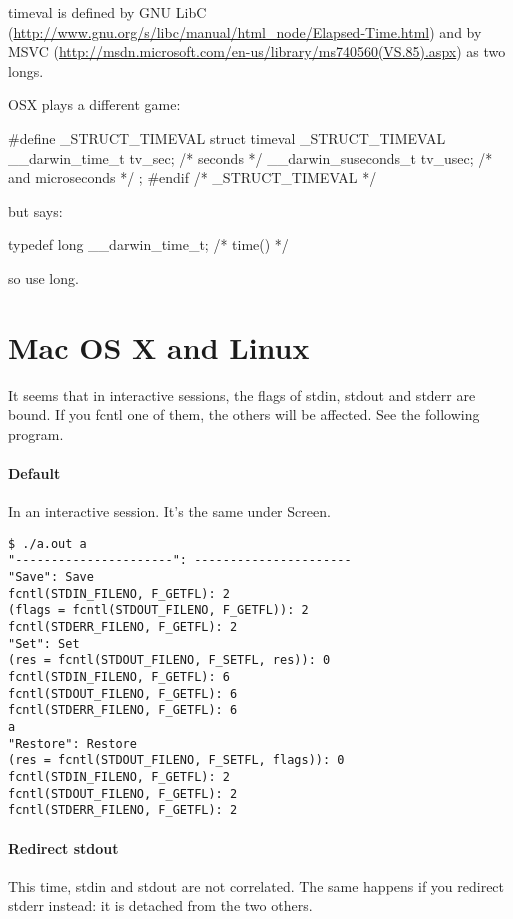 \documentclass[openright,twoside,11pt]{book}
\begin{document}
timeval is defined by GNU LibC
(\url{http://www.gnu.org/s/libc/manual/html_node/Elapsed-Time.html}) and by
MSVC (\url{http://msdn.microsoft.com/en-us/library/ms740560(VS.85).aspx}) as
two longs.

OSX plays a different game:

\begin{cxx}
#define _STRUCT_TIMEVAL         struct timeval
_STRUCT_TIMEVAL
{
        __darwin_time_t         tv_sec;         /* seconds */
        __darwin_suseconds_t    tv_usec;        /* and microseconds */
};
#endif /* _STRUCT_TIMEVAL */
\end{cxx}

\noindent
but  says:

\begin{cxx}
typedef long                 __darwin_time_t;        /* time() */
\end{cxx}

\noindent

so use long.

\section{Mac OS X and Linux}

It seems that in interactive sessions, the flags of stdin, stdout and stderr
are bound.  If you fcntl one of them, the others will be affected.  See the
following program.



\paragraph{Default}
In an interactive session.  It's the same under Screen.
\begin{lstlisting}
$ ./a.out a
"----------------------": ----------------------
"Save": Save
fcntl(STDIN_FILENO, F_GETFL): 2
(flags = fcntl(STDOUT_FILENO, F_GETFL)): 2
fcntl(STDERR_FILENO, F_GETFL): 2
"Set": Set
(res = fcntl(STDOUT_FILENO, F_SETFL, res)): 0
fcntl(STDIN_FILENO, F_GETFL): 6
fcntl(STDOUT_FILENO, F_GETFL): 6
fcntl(STDERR_FILENO, F_GETFL): 6
a
"Restore": Restore
(res = fcntl(STDOUT_FILENO, F_SETFL, flags)): 0
fcntl(STDIN_FILENO, F_GETFL): 2
fcntl(STDOUT_FILENO, F_GETFL): 2
fcntl(STDERR_FILENO, F_GETFL): 2
\end{lstlisting}

\paragraph{Redirect stdout}
This time, stdin and stdout are not correlated.  The same happens if you
redirect stderr instead: it is detached from the two others.
\end{document}
